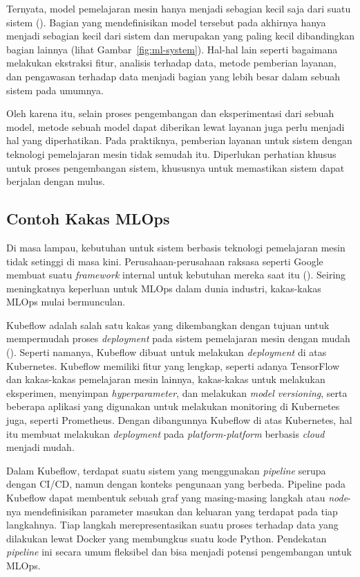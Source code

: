 Ternyata, model pemelajaran mesin hanya menjadi sebagian kecil saja dari suatu sistem (\cite{NIPS2015_86df7dcf}).
Bagian yang mendefinisikan model tersebut pada akhirnya hanya menjadi sebagian kecil dari sistem dan merupakan yang paling kecil dibandingkan bagian lainnya (lihat Gambar~\ref{fig:ml-system}).
Hal-hal lain seperti bagaimana melakukan ekstraksi fitur, analisis terhadap data, metode pemberian layanan, dan pengawasan terhadap data menjadi bagian yang lebih besar dalam sebuah sistem pada umumnya.

Oleh karena itu, selain proses pengembangan dan eksperimentasi dari sebuah model, metode sebuah model dapat diberikan lewat layanan juga perlu menjadi hal yang diperhatikan.
Pada praktiknya, pemberian layanan untuk sistem dengan teknologi pemelajaran mesin tidak semudah itu.
Diperlukan perhatian khusus untuk proses pengembangan sistem, khususnya untuk memastikan sistem dapat berjalan dengan mulus.

\subsection{Contoh Kakas MLOps}

Di masa lampau, kebutuhan untuk sistem berbasis teknologi pemelajaran mesin tidak setinggi di masa kini. 
Perusahaan-perusahaan raksasa seperti Google membuat suatu \textit{framework} internal untuk kebutuhan mereka saat itu (\cite{mlops}).
Seiring meningkatnya keperluan untuk MLOps dalam dunia industri, kakas-kakas MLOps mulai bermunculan.

Kubeflow adalah salah satu kakas yang dikembangkan dengan tujuan untuk mempermudah proses \textit{deployment} pada sistem pemelajaran mesin dengan mudah (\cite{k8s}).
Seperti namanya, Kubeflow dibuat untuk melakukan \textit{deployment} di atas Kubernetes.
Kubeflow memiliki fitur yang lengkap, seperti adanya TensorFlow dan kakas-kakas pemelajaran mesin lainnya, kakas-kakas untuk melakukan eksperimen, menyimpan \textit{hyperparameter}, dan melakukan \textit{model versioning}, serta beberapa aplikasi yang digunakan untuk melakukan monitoring di Kubernetes juga, seperti Prometheus.
Dengan dibangunnya Kubeflow di atas Kubernetes, hal itu membuat melakukan \textit{deployment} pada \textit{platform-platform} berbasis \textit{cloud} menjadi mudah.

Dalam Kubeflow, terdapat suatu sistem yang menggunakan \textit{pipeline} serupa dengan CI/CD, namun dengan konteks pengunaan yang berbeda.
Pipeline pada Kubeflow dapat membentuk sebuah graf yang masing-masing langkah atau \textit{node}-nya mendefinisikan parameter masukan dan keluaran yang terdapat pada tiap langkahnya.
Tiap langkah merepresentasikan suatu proses terhadap data yang dilakukan lewat Docker yang membungkus suatu kode Python.
Pendekatan \textit{pipeline} ini secara umum fleksibel dan bisa menjadi potensi pengembangan untuk MLOps.

